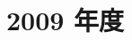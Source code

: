 \documentclass[../../hsm_tok_a.tex]{subfiles}
\begin{document}
    \section{2009 年度}

    

    \clearpage

    
\end{document}
